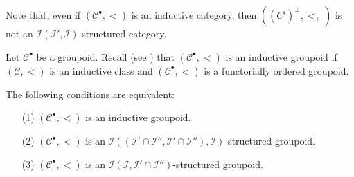 \documentclass[a4paper,fleqn]{article}
\theoremstyle{plain}
\newenvironment{theorem}[1]
  {\renewcommand\theinnertheorem{#1}\innertheorem}
  {\endinnertheorem}
\theoremstyle{definition}
\newcommand{\CC}{\mathcal{C}}
\newcommand{\II}{\mathcal{I}}
\begin{document}
Note that, even if $(\CC^\bullet,<)$ is an inductive category, then $((C^l)^\perp,<_\perp)$ is not an $\II(\II',\II)$-structured category.

Let $\CC^\bullet$ be a groupoid.
Recall (see \cite{3a}) that $(\CC^\bullet,<)$ is an inductive groupoid if $(\CC,<)$ is an inductive class and $(\CC^\bullet,<)$ is a functorially ordered groupoid.

\begin{theorem}{10}
\label{theorem:ii-10}
  The following conditions are equivalent:
  \begin{enumerate}
    \item[\normalfont(1)]
      $(\CC^\bullet,<)$ is an inductive groupoid.
    \item[\normalfont(2)]
      $(\CC^\bullet,<)$ is an $\II((\II'\cap\II'',\II'\cap\II''),\II)$-structured groupoid.
    \item[\normalfont(3)]
      $(\CC^\bullet,<)$ is an $\II(\II,\II'\cap\II'')$-structured groupoid.
  \end{enumerate}
\end{theorem}
\end{document}
